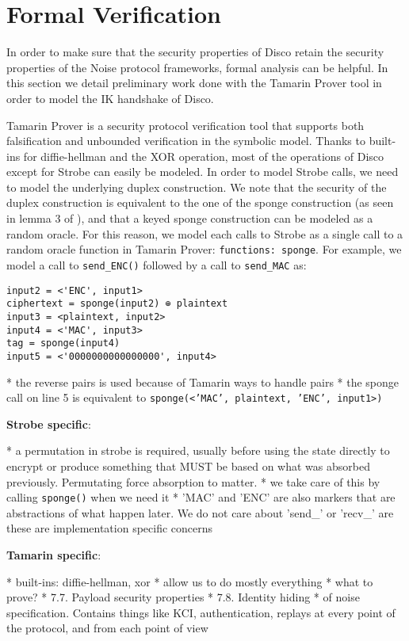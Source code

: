 
\section{Formal Verification}

In order to make sure that the security properties of Disco retain the security properties of the Noise protocol frameworks, formal analysis can be helpful. In this section we detail preliminary work done with the Tamarin Prover tool\cite{tamarinProver} in order to model the IK handshake of Disco.

Tamarin Prover is a security protocol verification tool that supports both falsification and unbounded verification in the symbolic model. Thanks to built-ins for diffie-hellman and the XOR operation, most of the operations of Disco except for Strobe can easily be modeled. In order to model Strobe calls, we need to model the underlying duplex construction. We note that the security of the duplex construction is equivalent to the one of the sponge construction (as seen in lemma 3 of \cite{spongeduplex}), and that a keyed sponge construction can be modeled as a random oracle\cite{keyedsponge}. For this reason, we model each calls to Strobe as a single call to a random oracle function in Tamarin Prover: \texttt{functions: sponge\1}. For example, we model a call to \texttt{send_ENC()} followed by a call to \texttt{send_MAC} as:

\begin{verbatim}
input2 = <'ENC', input1>
ciphertext = sponge(input2) ⊕ plaintext
input3 = <plaintext, input2>
input4 = <'MAC', input3>
tag = sponge(input4)
input5 = <'0000000000000000', input4>
\end{verbatim}

* the reverse pairs is used because of Tamarin ways to handle pairs
* the sponge call on line 5 is equivalent to \texttt{sponge(<'MAC', plaintext, 'ENC', input1>)}

\textbf{Strobe specific}:

* a permutation in strobe is required, usually before using the state directly to encrypt or produce something that MUST be based on what was absorbed previously. Permutating force absorption to matter.
* we take care of this by calling \texttt{sponge()} when we need it
* 'MAC' and 'ENC' are also markers that are abstractions of what happen later. We do not care about 'send_' or 'recv_' are these are implementation specific concerns

\textbf{Tamarin specific}:

* built-ins: diffie-hellman, xor
* allow us to do mostly everything
* what to prove?
* 7.7. Payload security properties
* 7.8. Identity hiding
* of noise specification. Contains things like KCI, authentication, replays at every point of the protocol, and from each point of view
